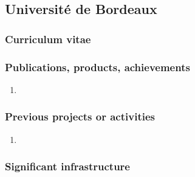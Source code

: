 \subsection*{Université de Bordeaux}




\subsubsection*{Curriculum vitae}


%
%
%

\subsubsection*{Publications, products, achievements}

\begin{enumerate}
\item {}
\end{enumerate}

\subsubsection*{Previous projects or activities}

\begin{enumerate}
\item {}
\end{enumerate}

\subsubsection*{Significant infrastructure}

